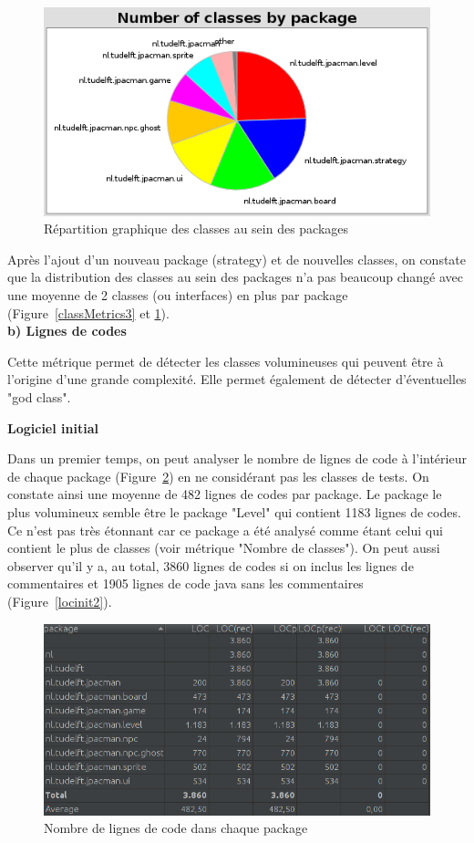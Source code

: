 \documentclass[12pt, openany]{report}
\begin{document}
\begin{figure}[!h]
	\centering
	\includegraphics[scale=0.7]{Images/classMetrics4.png} 
	\caption{Répartition graphique des classes au sein des packages}
	\label{classMetrics4}
\end{figure}
\newpage
Après l'ajout d'un nouveau package (strategy) et de nouvelles classes, on constate que la distribution des classes au sein des packages n'a pas beaucoup changé avec une moyenne de 2 classes (ou interfaces) en plus par package (Figure~\ref{classMetrics3} et \ref{classMetrics4}).\\


\textbf{b) Lignes de codes}


Cette métrique permet de détecter les classes volumineuses qui peuvent être à l'origine d'une grande complexité. Elle permet également de détecter d'éventuelles "god class".

\textbf{Logiciel initial}

Dans un premier temps, on peut analyser le nombre de lignes de code à l'intérieur de chaque package (Figure~\ref{locinit}) en ne considérant pas les classes de tests. On constate ainsi une moyenne de 482 lignes de codes par package. Le package le plus volumineux semble être le package "Level" qui contient 1183 lignes de codes. Ce n'est pas très étonnant car ce package a été analysé comme étant celui qui contient le plus de classes (voir métrique "Nombre de classes"). On peut aussi observer qu'il y a, au total, 3860 lignes de codes si on inclus les lignes de commentaires et 1905 lignes de code java sans les commentaires (Figure~\ref{locinit2}).

\begin{figure}[!h]
	\centering
	\includegraphics[scale=0.6]{Images/SizeMetricsLOC.png} 
	\caption{Nombre de lignes de code dans chaque package}
	\label{locinit}
\end{figure}
\end{document}
